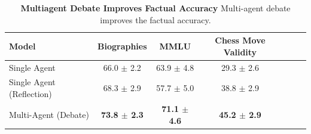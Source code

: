 \begin{table}[t]
\small\setlength{\tabcolsep}{5.5pt}
\centering
\begin{tabular}{lcccccc}
      {\bf Model} & {\bf Biographies} & {\bf MMLU} & {\bf Chess Move Validity} \\
      \midrule
      Single Agent & 66.0 $\pm$ 2.2 & 63.9 $\pm$ 4.8 & 29.3 $\pm$ 2.6\\
      Single Agent (Reflection) & 68.3 $\pm$ 2.9 & 57.7 $\pm$ 5.0 & 38.8 $\pm$ 2.9 \\
      Multi-Agent (Debate) & \textbf{73.8 $\pm$ 2.3} & \textbf{71.1 $\pm$ 4.6} & \textbf{45.2 $\pm$ 2.9}   \\
    \bottomrule
\end{tabular}
\caption{\small \textbf{Multiagent Debate Improves Factual Accuracy}  Multi-agent debate improves the factual accuracy.}
\label{tbl:accuracy}
\vspace{-5pt}
\end{table}
